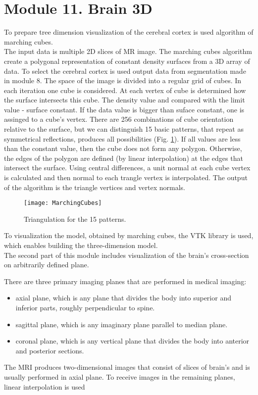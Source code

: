 \section{Module 11. Brain 3D}

\indent To prepare tree dimension visualization of the cerebral cortex
is used algorithm of marching cubes.\\
 \indent The input data is multiple 2D slices of MR image. The marching
cubes algorithm create a polygonal representation of constant density
surfaces from a 3D array of data. To select the cerebral cortex is
used output data from segmentation made in module 8. The space of
the image is divided into a regular grid of cubes. In each iteration
one cube is considered. At each vertex of cube is determined how the
surface intersects this cube. The density value and compared with
the limit value - surface constant. If the data value is bigger than
suface constant, one is assinged to a cube's vertex. There are 256
combinations of cube orientation relative to the surface, but we can
distinguish 15 basic patterns, that repeat as symmetrical reflections,
produces all possibilities (Fig. \ref{fig:Marching cubes}). If all
values \LyXZeroWidthSpace \LyXZeroWidthSpace are less than the constant
value, then the cube does not form any polygon. Otherwise, the edges
of the polygon are defined (by linear interpolation) at the edges
that intersect the surface. Using central differences, a unit normal
at each cube vertex is calculated and then normal to each trangle
vertex is interpolated. The output of the algorithm is the triangle
vertices and vertex normals.

\begin{figure}[H]
\centering{}\texttt{[image: MarchingCubes]}\caption{Triangulation for the 15 patterns. \label{fig:Marching cubes}}
\end{figure}

\indent To visualization the model, obtained by marching cubes, the
VTK library is used, which enables building the three-dimension model.
\\
 \indent The second part of this module includes visualization of
the brain's cross-section on arbitrarily defined plane. \\
 \indent

There are three primary imaging planes that are performed in medical
imaging: 
\begin{itemize}
\item axial plane, which is any plane that divides the body into superior
and inferior parts, roughly perpendicular to spine. 
\item sagittal plane, which is any imaginary plane parallel to median plane. 
\item coronal plane, which is any vertical plane that divides the body into
anterior and posterior sections. 
\end{itemize}
The MRI produces two-dimensional images that consist of slices of
brain's and is usually performed in axial plane. To receive images
in the remaining planes, linear interpolation is used